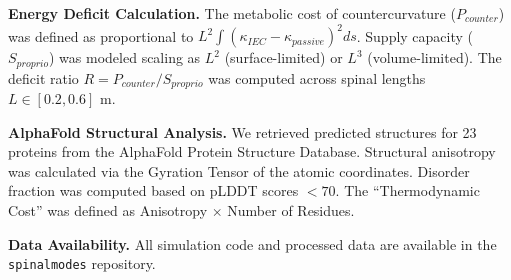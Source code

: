 \documentclass[12pt]{article}
\begin{document}
\textbf{Energy Deficit Calculation.} The metabolic cost of countercurvature ($P_{counter}$) was defined as proportional to $L^2 \int (\kappa_{IEC} - \kappa_{passive})^2 ds$. Supply capacity ($S_{proprio}$) was modeled scaling as $L^2$ (surface-limited) or $L^3$ (volume-limited). The deficit ratio $R = P_{counter} / S_{proprio}$ was computed across spinal lengths $L \in [0.2, 0.6]$ m.

\textbf{AlphaFold Structural Analysis.} We retrieved predicted structures for 23 proteins from the AlphaFold Protein Structure Database\cite{jumper2021}. Structural anisotropy was calculated via the Gyration Tensor of the atomic coordinates. Disorder fraction was computed based on pLDDT scores $< 70$. The ``Thermodynamic Cost'' was defined as Anisotropy $\times$ Number of Residues.

\textbf{Data Availability.} All simulation code and processed data are available in the \texttt{spinalmodes} repository.
\end{document}

